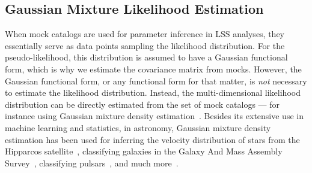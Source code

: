 \documentclass[12pt, letterpaper, preprint]{aastex}
\begin{document}
\subsection{Gaussian Mixture Likelihood Estimation} \label{sec:gmm}
When mock catalogs are used for parameter inference in LSS analyses, 
they essentially serve as data points sampling the likelihood distribution. 
For the pseudo-likelihood, this distribution is assumed to have a 
Gaussian functional form, which is why we estimate the covariance matrix 
from mocks. However, the Gaussian functional form, or any functional form for 
that matter, is \emph{not} necessary to estimate the likelihood distribution. 
Instead, the multi-dimensional likelihood distribution 
can be directly estimated from the set of mock catalogs --- for 
instance using Gaussian mixture density 
estimation~\citep{Press:1992:NRC:148286,9780471006268}. 
Besides its extensive use in machine learning and statistics, 
in astronomy, Gaussian mixture density estimation has been used for 
inferring the velocity distribution of stars from the Hipparcos 
satellite~\citep{bovy2011}, classifying galaxies in the Galaxy And Mass Assembly 
Survey~\citep{taylor2015}, classifying pulsars~\citep{lee2012}, and much more~\citep[see also][]{hogg2010,kuhn2017}. 
\end{document}
